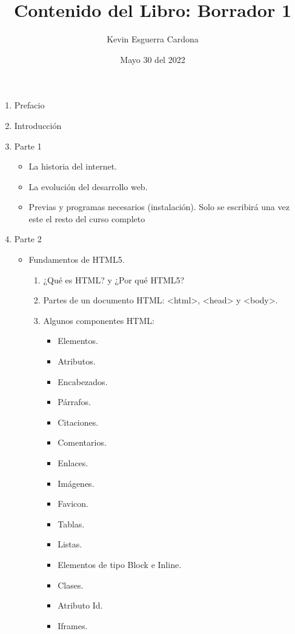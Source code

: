 \documentclass[12pt, letterpaper]{article}
\title{Contenido del Libro: Borrador 1}
\author{Kevin  Esguerra Cardona}
\date{Mayo 30 del 2022}
\begin{document}
\maketitle

\begin{enumerate}
    \item Prefacio
    \item Introducción
    \item Parte 1
    \begin{itemize}
        \item La historia del internet.
        \item La evolución del desarrollo web.
        \item Previas y programas necesarios (instalación). \newline*Solo se escribirá  una vez este el resto del curso completo
    \end{itemize}
    \item Parte 2
    \begin{itemize}
        \item Fundamentos de HTML5.
        \begin{enumerate}
            \item ¿Qué es HTML? y ¿Por qué HTML5?
            \item Partes de un documento HTML: <html>, <head> y <body>.
            \item Algunos componentes HTML:
            \begin{itemize}
                \item Elementos.
                \item Atributos.
                \item Encabezados.
                \item Párrafos.
                \item Citaciones.
                \item Comentarios.
                \item Enlaces.
                \item Imágenes.
                \item Favicon.
                \item Tablas.
                \item Listas.
                \item Elementos de tipo Block e Inline.
                \item Clases.
                \item Atributo Id.
                \item Iframes.

\end{itemize}
\end{enumerate}
\end{itemize}
\end{enumerate}
\end{document}
